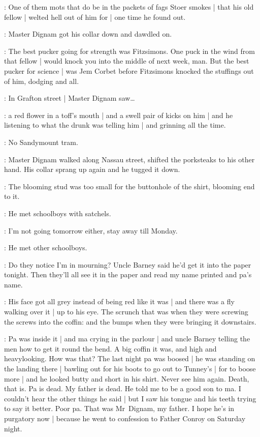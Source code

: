 \masterdignam:
One of them mots that do be in the packets of fags Stoer smokes |
that his old fellow |
welted hell out of him for |
one time he found out.

:
Master Dignam got his collar down and dawdled on.

\masterdignam:
The best pucker
going for strength was Fitzsimons.
One puck in the wind from that fellow |
would knock you into the middle of next week, man.
But the best pucker for science |
was Jem Corbet
before Fitzsimons knocked the stuffings out of him,
dodging and all.

:
In Grafton street |
Master Dignam saw\ldots

\masterdignam:
a red flower in a toff's mouth |
and a swell pair of kicks on him |
and he listening to what the drunk was telling him |
and grinning all the time.

\masterdignam:
No Sandymount tram.

:
Master Dignam walked along Nassau street,
shifted the porksteaks to his other hand.
His collar sprang up again and he tugged it down.

\masterdignam:
The blooming stud was too small
for the buttonhole of the shirt,
blooming end to it.

:
He met schoolboys with satchels.

\masterdignam:
I'm not going tomorrow either,
stay away till Monday.

:
He met other schoolboys.

\masterdignam:
Do they notice I'm in mourning?
Uncle Barney said he'd get it into the paper tonight.
Then they'll all see it in the paper%
and read my name printed and pa's name.

\masterdignam:
His face got all grey
instead of being red like it was |
and there was a fly walking over it |
up to his eye.
The scrunch that was
when they were screwing the screws into the coffin:
and the bumps when they were bringing it downstairs.

\masterdignam:
Pa was inside it |
and ma crying in the parlour |
and uncle Barney telling the men
how to get it round the bend.
A big coffin it was,
and high and heavylooking.
How was that?
The last night pa was boosed |
he was standing on the landing there |
bawling out for his boots to go out to Tunney's |
for to boose more |
and he looked butty and short in his shirt.
Never see him again.
Death, that is.
Pa is dead.
My father is dead.%
He told me to be a good son to ma.
I couldn't hear the other things he said |
but I saw his tongue and his teeth trying to say it better.
Poor pa.
That was Mr~Dignam, my father.
I hope he's in purgatory now |
because he went to confession to Father Conroy on Saturday night.


